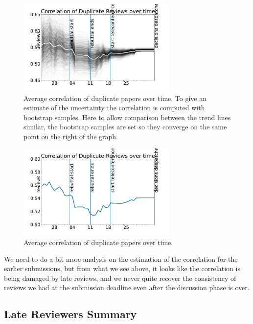 \begin{figure}[htb]
\includegraphics[width=0.70\textwidth]{diagrams/neurips/correlation-duplicate-reviews-bootstrap.pdf}


\caption{Average correlation of duplicate papers over time. To give an estimate of the uncertainty the correlation is computed with bootstrap samples. Here to allow comparison between the trend lines similar, the bootstrap samples are set so they converge on the same point on the right of the graph.}
\label{correlation-duplicate-reviews-bootstrap}
\end{figure}

\begin{figure}[htb]
\includegraphics[width=0.70\textwidth]{diagrams/neurips/correlation-duplicate-reviews.pdf}


\caption{Average correlation of duplicate papers over time.}
\label{correlation-duplicate-reviews}
\end{figure}

We need to do a bit more analysis on the estimation of the correlation
for the earlier submissions, but from what we see above, it looks like
the correlation is being damaged by late reviews, and we never quite
recover the consistency of reviews we had at the submission deadline
even after the discussion phase is over.

\hypertarget{late-reviewers-summary}{%
\subsection{Late Reviewers Summary}\label{late-reviewers-summary}}

